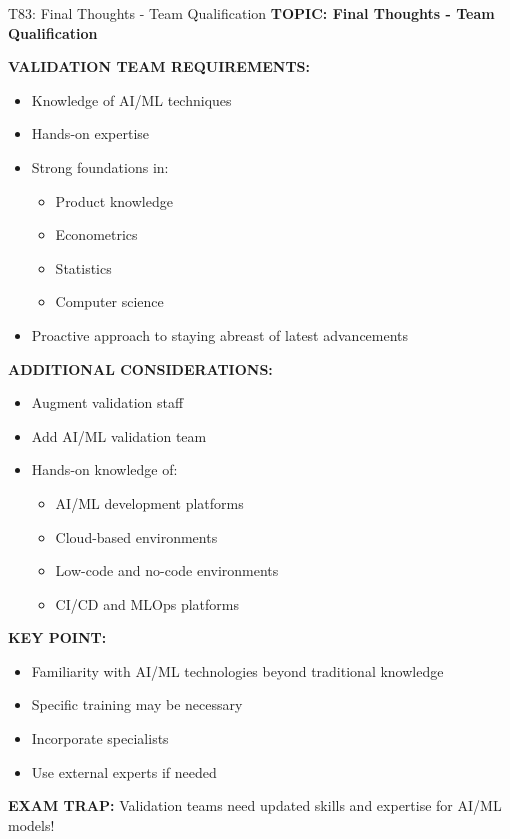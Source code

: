 \documentclass[8pt]{beamer}
\begin{document}
	\begin{frame}{T83: Final Thoughts - Team Qualification}
		\fontsize{6.5}{7.5}\selectfont
		\textbf{TOPIC: Final Thoughts - Team Qualification}
		
		\vspace{0.1cm}
		\textbf{VALIDATION TEAM REQUIREMENTS:}
		\begin{itemize}
			\item Knowledge of AI/ML techniques
			\item Hands-on expertise
			\item Strong foundations in:
			\begin{itemize}
				\item Product knowledge
				\item Econometrics
				\item Statistics
				\item Computer science
			\end{itemize}
			\item Proactive approach to staying abreast of latest advancements
		\end{itemize}
		
		\vspace{0.1cm}
		\textbf{ADDITIONAL CONSIDERATIONS:}
		\begin{itemize}
			\item Augment validation staff
			\item Add AI/ML validation team
			\item Hands-on knowledge of:
			\begin{itemize}
				\item AI/ML development platforms
				\item Cloud-based environments
				\item Low-code and no-code environments
				\item CI/CD and MLOps platforms
			\end{itemize}
		\end{itemize}
		
		\vspace{0.1cm}
		\textbf{KEY POINT:}
		\begin{itemize}
			\item Familiarity with AI/ML technologies beyond traditional knowledge
			\item Specific training may be necessary
			\item Incorporate specialists
			\item Use external experts if needed
		\end{itemize}
		
		\textcolor{myred}{\textbf{EXAM TRAP:}} Validation teams need \textcolor{myblue}{updated skills and expertise for AI/ML models}!
	\end{frame}
	
\end{document}
